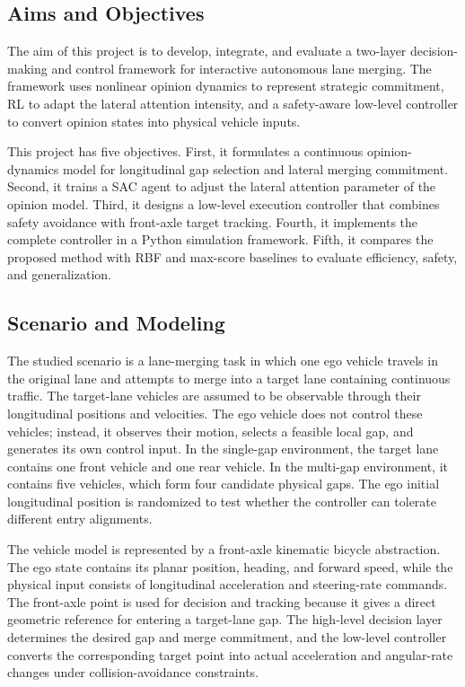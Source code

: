 \subsection{Aims and Objectives}

The aim of this project is to develop, integrate, and evaluate a two-layer decision-making and control framework for interactive autonomous lane merging. The framework uses nonlinear opinion dynamics to represent strategic commitment, RL to adapt the lateral attention intensity, and a safety-aware low-level controller to convert opinion states into physical vehicle inputs.

This project has five objectives. First, it formulates a continuous opinion-dynamics model for longitudinal gap selection and lateral merging commitment. Second, it trains a SAC agent to adjust the lateral attention parameter of the opinion model. Third, it designs a low-level execution controller that combines safety avoidance with front-axle target tracking. Fourth, it implements the complete controller in a Python simulation framework. Fifth, it compares the proposed method with RBF and max-score baselines to evaluate efficiency, safety, and generalization.

\subsection{Scenario and Modeling}

The studied scenario is a lane-merging task in which one ego vehicle travels in the original lane and attempts to merge into a target lane containing continuous traffic. The target-lane vehicles are assumed to be observable through their longitudinal positions and velocities. The ego vehicle does not control these vehicles; instead, it observes their motion, selects a feasible local gap, and generates its own control input. In the single-gap environment, the target lane contains one front vehicle and one rear vehicle. In the multi-gap environment, it contains five vehicles, which form four candidate physical gaps. The ego initial longitudinal position is randomized to test whether the controller can tolerate different entry alignments.

The vehicle model is represented by a front-axle kinematic bicycle abstraction. The ego state contains its planar position, heading, and forward speed, while the physical input consists of longitudinal acceleration and steering-rate commands. The front-axle point is used for decision and tracking because it gives a direct geometric reference for entering a target-lane gap. The high-level decision layer determines the desired gap and merge commitment, and the low-level controller converts the corresponding target point into actual acceleration and angular-rate changes under collision-avoidance constraints.


